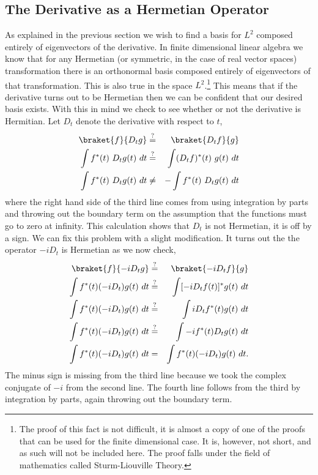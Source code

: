 \subsection{The Derivative as a Hermetian Operator}
As explained in the previous section we wish to find a basis for $L^2$ composed entirely of eigenvectors of the derivative.  In finite dimensional linear algebra we know that for any Hermetian (or symmetric, in the case of real vector spaces) transformation there is an orthonormal basis composed entirely of eigenvectors of that transformation.  This is also true in the space $L^2$.\footnote{The proof of this fact is not difficult, it is almost a copy of one of the proofs that can be used for the finite dimensional case.  It is, however, not short, and as such will not be included here.  The proof falls under the field of mathematics called Sturm-Liouville Theory.}  This means that if the derivative turns out to be Hermetian then we can be confident that our desired basis exists.  With this in mind we check to see whether or not the derivative is Hermitian.  Let $D_t$ denote the derivative with respect to $t$,
\begin{eqnarray*}
\braket{f}{D_tg} &\stackrel{?}{=}& \braket{D_tf}{g}\\
\int f^*(t)~D_tg(t)~dt &\stackrel{?}{=}& \int (D_tf)^*(t)~g(t)~dt\\
\int f^*(t)~D_tg(t)~dt &\neq& -\int  f^*(t)~D_tg(t)~dt
\end{eqnarray*}
where the right hand side of the third line comes from using integration by parts and throwing out the boundary term on the assumption that the functions must go to zero at infinity.  This calculation shows that $D_t$ is not Hermetian, it is off by a sign.  We can fix this problem with a slight modification.  It turns out the the operator $-iD_t$ is Hermetian as we now check,
\begin{eqnarray*}
\braket{f}{-iD_tg} &\stackrel{?}{=}& \braket{-iD_tf}{g}\\
\int f^*(t)(-iD_t)g(t)~dt &\stackrel{?}{=}& \int [-iD_tf(t)]^*g(t)~dt\\
\int f^*(t)(-iD_t)g(t)~dt &\stackrel{?}{=}& \int iD_tf^*(t)g(t)~dt\\
\int f^*(t)(-iD_t)g(t)~dt &\stackrel{?}{=}& \int -if^*(t) D_tg(t)~dt\\
\int f^*(t)(-iD_t)g(t)~dt &=& \int f^*(t)(-iD_t)g(t)~dt.\\
\end{eqnarray*}
The minus sign is missing from the third line because we took the complex conjugate of $-i$ from the second line.  The fourth line follows from the third by integration by parts, again throwing out the boundary term.


